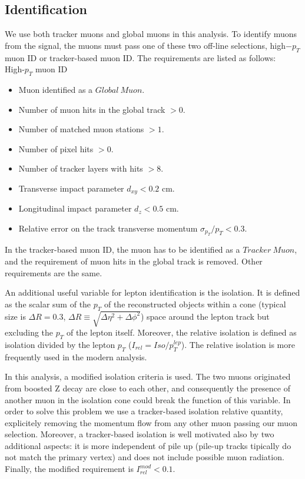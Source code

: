 \newpage
\subsection*{Identification}
We use both tracker muons and global muons in this analysis. To identify muons from the signal, the muons must pass one of these two off-line selections, high$-p_{T}$ muon ID or tracker-based muon ID\cite{MuonID}. The requirements are listed as follows:\\

High-$p_{T}$ muon ID
\begin{itemize}
\item Muon identified as a $Global~Muon$.
\item Number of muon hits in the global track $> 0$.
\item Number of matched muon stations $> 1$.
\item Number of pixel hits $> 0$.
\item Number of tracker layers with hits $> 8$.
\item Transverse impact parameter $d_{xy} < 0.2$ cm.
\item Longitudinal impact parameter $d_{z} < 0.5$ cm.
\item Relative error on the track transverse momentum $\sigma_{p_{T}}/p_{T} < 0.3$.\\
\end{itemize}

In the tracker-based muon ID, the muon has to be identified as a $Tracker~Muon$, and the requirement of muon hits in the global track is removed. Other requirements are the same.

An additional useful variable for lepton identification is the isolation. It is defined as the scalar sum of the $p_{T}$ of the reconstructed objects within a cone (typical size is $\Delta R=0.3$, $\Delta R \equiv\sqrt{\Delta\eta^{2}+\Delta\phi^{2}}$) space around the lepton track but excluding the $p_{T}$ of the lepton itself. Moreover, the relative isolation is defined as isolation divided by the lepton $p_{T}$ ($I_{rel} = Iso/p_{T}^{lep}$). The relative isolation is more frequently used in the modern analysis.

In this analysis, a modified isolation criteria is used. The two muons originated from boosted Z decay are close to each other, and consequently the presence of another muon in the isolation cone could break the function of this variable. In order to solve this problem we use a tracker-based isolation relative quantity, explicitely removing the momentum flow from any other muon passing our muon selection. Moreover, a tracker-based isolation is well motivated also by two additional aspects: it is more independent of pile up (pile-up tracks tipically do not match the primary vertex) and does not include possible muon radiation. Finally, the modified requirement is $I_{rel}^{mod} < 0.1$.\\

